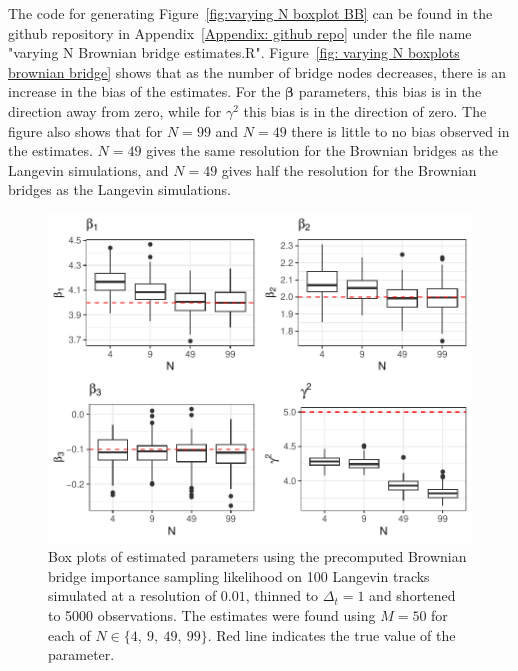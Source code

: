 The code for generating Figure~\ref{fig:varying N boxplot BB} can be found in the github repository in Appendix~\ref{Appendix: github repo} under the file name "varying N Brownian bridge estimates.R". Figure~\ref{fig: varying N boxplots brownian bridge} shows that as the number of bridge nodes decreases, there is an increase in the bias of the estimates. For the $\bm \beta$ parameters, this bias is in the direction away from zero, while for $\gamma^2$ this bias is in the direction of zero. The figure also shows that for $N=99$ and $N=49$ there is little to no bias observed in the estimates. $N = 49$ gives the same resolution for the Brownian bridges as the Langevin simulations, and $N=49$ gives half the resolution for the Brownian bridges as the Langevin simulations.

\begin{figure}[H]
    \centering
    \includegraphics[width=\linewidth]{Images/Results/varying N estimates precomputed BB.pdf}
    \caption[Box plots of Parameter Estimates using precomputed Brownian bridge importance sampling using different numbers of bridge nodes]{Box plots of estimated parameters using the precomputed Brownian bridge importance sampling likelihood on 100 Langevin tracks simulated at a resolution of $0.01$, thinned to $\Delta_t = 1$ and shortened to 5000 observations. The estimates were found using $M=50$ for each of $N \in \{4 , \ 9, \ 49, \ 99\}$. Red line indicates the true value of the parameter.}
    \label{fig: varying N boxplots precomputed brownian bridge}
\end{figure}

